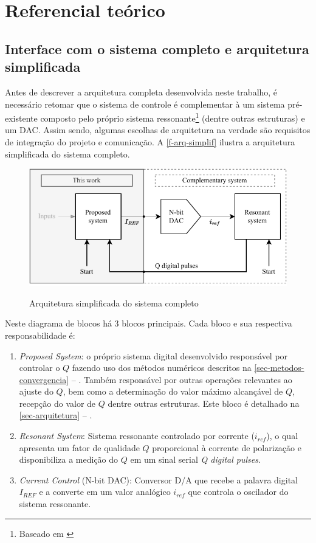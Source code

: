 \chapter{Referencial teórico}\label{ch-referencial}

\section{Interface com o sistema completo e arquitetura simplificada}\label{sec-interface}

Antes de descrever a arquitetura completa desenvolvida neste trabalho, é necessário retomar que o sistema de controle é complementar à um sistema pré-existente composto pelo próprio sistema ressonante\footnote{Baseado em \cite{tese-pmms}} (dentre outras estruturas) e um DAC. Assim sendo, algumas escolhas de arquitetura na verdade são requisitos de integração do projeto e comunicação. A \autoref{f-arq-simplif} ilustra a arquitetura simplificada do sistema completo.

\begin{figure}[H]
    \centering
    \caption{Arquitetura simplificada do sistema completo}
    \includegraphics[width=.7\textwidth]{fig/arq-simplif.pdf}
    \label{f-arq-simplif}
\end{figure}

Neste diagrama de blocos há 3 blocos principais. Cada bloco e sua respectiva responsabilidade é:

\begin{enumerate}
    \item \textit{Proposed System}: o próprio sistema digital desenvolvido responsável por controlar o $Q$ fazendo uso dos métodos numéricos descritos na \autoref{sec-metodos-convergencia} -- . Também responsável por outras operações relevantes ao ajuste do $Q$, bem como a determinação do valor máximo alcançável de $Q$, recepção do valor de $Q$ dentre outras estruturas. Este bloco é detalhado na \autoref{sec-arquitetura} -- .
    \item \textit{Resonant System}: Sistema ressonante controlado por corrente ($i_{ref}$), o qual apresenta um fator de qualidade $Q$ proporcional à corrente de polarização e disponibiliza a medição do $Q$ em um sinal serial \textit{Q digital pulses}.
    \item \textit{Current Control} (N-bit DAC): Conversor D/A que recebe a palavra digital $I_{REF}$ e a converte em um valor analógico $i_{ref}$ que controla o oscilador do sistema ressonante. 
\end{enumerate}


